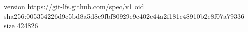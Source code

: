 version https://git-lfs.github.com/spec/v1
oid sha256:005354226d9c5bd8a5d8c9fbf80929e9c402c44a2f181c48910b2e8f07a79336
size 424826
